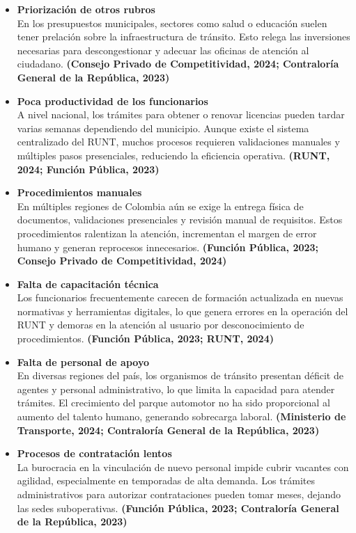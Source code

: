 \begin{itemize}
\item \textbf{Priorización de otros rubros} \\
En los presupuestos municipales, sectores como salud o educación suelen tener prelación sobre la infraestructura de tránsito. Esto relega las inversiones necesarias para descongestionar y adecuar las oficinas de atención al ciudadano.  
\textbf{(Consejo Privado de Competitividad, 2024; Contraloría General de la República, 2023)}

\item \textbf{Poca productividad de los funcionarios} \\
A nivel nacional, los trámites para obtener o renovar licencias pueden tardar varias semanas dependiendo del municipio. Aunque existe el sistema centralizado del RUNT, muchos procesos requieren validaciones manuales y múltiples pasos presenciales, reduciendo la eficiencia operativa.  
\textbf{(RUNT, 2024; Función Pública, 2023)}

\item \textbf{Procedimientos manuales} \\
En múltiples regiones de Colombia aún se exige la entrega física de documentos, validaciones presenciales y revisión manual de requisitos. Estos procedimientos ralentizan la atención, incrementan el margen de error humano y generan reprocesos innecesarios.  
\textbf{(Función Pública, 2023; Consejo Privado de Competitividad, 2024)}

\item \textbf{Falta de capacitación técnica} \\
Los funcionarios frecuentemente carecen de formación actualizada en nuevas normativas y herramientas digitales, lo que genera errores en la operación del RUNT y demoras en la atención al usuario por desconocimiento de procedimientos.  
\textbf{(Función Pública, 2023; RUNT, 2024)}

\item \textbf{Falta de personal de apoyo} \\
En diversas regiones del país, los organismos de tránsito presentan déficit de agentes y personal administrativo, lo que limita la capacidad para atender trámites. El crecimiento del parque automotor no ha sido proporcional al aumento del talento humano, generando sobrecarga laboral.  
\textbf{(Ministerio de Transporte, 2024; Contraloría General de la República, 2023)}

\item \textbf{Procesos de contratación lentos} \\
La burocracia en la vinculación de nuevo personal impide cubrir vacantes con agilidad, especialmente en temporadas de alta demanda. Los trámites administrativos para autorizar contrataciones pueden tomar meses, dejando las sedes suboperativas.  
\textbf{(Función Pública, 2023; Contraloría General de la República, 2023)}


\end{itemize}
